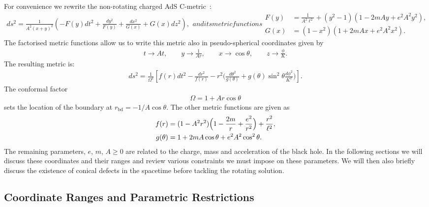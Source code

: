 \documentclass[
twoside,
openright,
frontopenright,
]{dmathesis}
\newcommand{\nn}{\nonumber}
\newcommand{\bd}{\mathrm{bd}}
\begin{document}
For convenience we rewrite the non-rotating charged AdS
C-metric~\cite{Hong:2003gx,Hong:2004dm}:
\begin{subequations}
  \label{eq:NRyx}
  \begin{align}
    \label{eq:NRyx-metric}
    ds^2 = \frac{1}{A^2(x+y)^2} \left(-F(y)dt^2 + \frac{dy^2}{F(y)} +
    \frac{dx^2}{G(x)} + G(x) dz^2\right),
  \end{align}
  and its metric functions
  \begin{align}
    \label{eq:NRyx-fn}
    F(y)&=\frac{1}{A^2 \ell^2} + (y^2 - 1)(1-2mAy+e^2A^2y^2),\nn\\
    G(x)&=(1-x^2)(1+2mAx+e^2A^2x^2).
  \end{align}
\end{subequations}
The factorised metric functions allow us to write this metric also in
pseudo-spherical coordinates given by
\begin{gather}
  t \to At, \qquad y \to \frac{1}{Ar}, \qquad x \to \cos\theta, \qquad z \to
  \frac{\phi}{K}.
\end{gather}
The resulting metric is:
\begin{align}
\label{eq:NRrth-metric}
ds^2=\frac{1}{\Omega^2}\left[ 
f(r) dt^2
-\frac{dr^2}{f(r)} - r^2 \Big( \frac{d\theta^2}{g(\theta)} 
+ g(\theta)\sin^2\theta \frac{d\phi^2}{K^2}\Big)\right].
\end{align}
The conformal factor
\begin{align}\label{eq:conf}
\Omega=1+Ar\cos\theta
\end{align}
sets the location of the boundary at $r_\bd=-1/A\cos\theta$. The other metric
functions are given as
\begin{align}
\label{eq:NRrth-fn}
f(r)&=(1-A^2r^2)\Bigl(1-\frac{2 m}{r}+\frac{e^2}{r^2}\Bigr)
+\frac{r^2}{\ell^2},\nn\\
g(\theta)&=1+2mA \cos\theta+ e^2A^2 \cos^2\theta.
\end{align}
The remaining parameters, $e$, $m$, $A\geqslant 0$ are related to the charge,
mass and acceleration of the black hole. In the following sections we will
discuss these coordinates and their ranges and review various constraints we
must impose on these parameters. We will then also briefly discuss the existence
of conical defects in the spacetime before tackling the rotating solution.

\subsection{Coordinate Ranges and Parametric Restrictions}
\label{sec:parameters}
\end{document}
